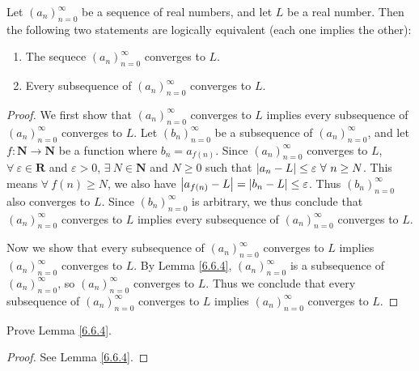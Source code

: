 \begin{proposition}\label{6.6.5}
Let \((a_n)_{n = 0}^\infty\) be a sequence of real numbers, and let \(L\) be a real number.
Then the following two statements are logically equivalent (each one implies the other):
\begin{enumerate}
    \item The sequece \((a_n)_{n = 0}^\infty\) converges to \(L\).
    \item Every subsequence of \((a_n)_{n = 0}^\infty\) converges to \(L\).
\end{enumerate}
\end{proposition}

\begin{proof}
We first show that \((a_n)_{n = 0}^\infty\) converges to \(L\) implies every subsequence of \((a_n)_{n = 0}^\infty\) converges to \(L\).
Let \((b_n)_{n = 0}^\infty\) be a subsequence of \((a_n)_{n = 0}^\infty\), and let \(f : \mathbf{N} \to \mathbf{N}\) be a function where \(b_n = a_{f(n)}\).
Since \((a_n)_{n = 0}^\infty\) converges to \(L\), \(\forall\ \varepsilon \in \mathbf{R}\) and \(\varepsilon > 0\), \(\exists\ N \in \mathbf{N}\) and \(N \geq 0\) such that \(\abs*{a_n - L} \leq \varepsilon \ \forall\ n \geq N\).
This means \(\forall\ f(n) \geq N\), we also have \(\abs*{a_{f(n)} - L} = \abs*{b_n - L} \leq \varepsilon\).
Thus \((b_n)_{n = 0}^\infty\) also converges to \(L\).
Since \((b_n)_{n = 0}^\infty\) is arbitrary, we thus conclude that \((a_n)_{n = 0}^\infty\) converges to \(L\) implies every subsequence of \((a_n)_{n = 0}^\infty\) converges to \(L\).

Now we show that every subsequence of \((a_n)_{n = 0}^\infty\) converges to \(L\) implies \((a_n)_{n = 0}^\infty\) converges to \(L\).
By Lemma \ref{6.6.4}, \((a_n)_{n = 0}^\infty\) is a subsequence of \((a_n)_{n = 0}^\infty\), so \((a_n)_{n = 0}^\infty\) converges to \(L\).
Thus we conclude that every subsequence of \((a_n)_{n = 0}^\infty\) converges to \(L\) implies \((a_n)_{n = 0}^\infty\) converges to \(L\).
\end{proof}

\exercisesection

\begin{exercise}\label{ex 6.6.1}
Prove Lemma \ref{6.6.4}.
\end{exercise}

\begin{proof}
See Lemma \ref{6.6.4}.
\end{proof}